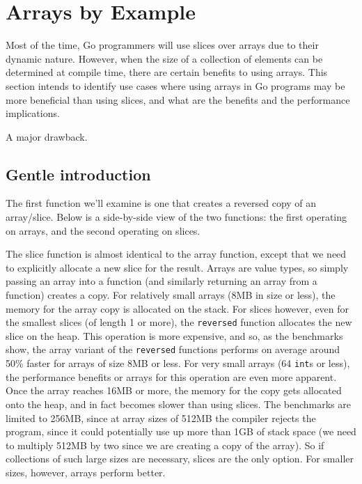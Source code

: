 \section{Arrays by Example}

Most of the time, Go programmers will use slices over arrays due to their
dynamic nature. However, when the size of a collection of elements can be
determined at compile time, there are certain benefits to using arrays. This
section intends to identify use cases where using arrays in Go programs may be
more beneficial than using slices, and what are the benefits and the performance
implications.

A major drawback.

\subsection{Gentle introduction}

The first function we'll examine is one that creates a reversed copy of an
array/slice. Below is a side-by-side view of the two functions: the first
operating on arrays, and the second operating on slices.






The slice function is almost identical to the array function, except that we
need to explicitly allocate a new slice for the result. Arrays are value types,
so simply passing an array into a function (and similarly returning an array
from a function) creates a copy. For relatively small arrays (8MB in size or
less), the memory for the array copy is allocated on the stack. For slices
however, even for the smallest slices (of length 1 or more), the
\texttt{reversed} function allocates the new slice on the heap. This operation
is more expensive, and so, as the benchmarks show, the array variant of the
\texttt{reversed} functions performs on average around 50\% faster for arrays of
size 8MB or less. For very small arrays (64 \texttt{int}s or less), the
performance benefits or arrays for this operation are even more apparent. Once
the array reaches 16MB or more, the memory for the copy gets allocated onto the
heap, and in fact becomes slower than using slices. The benchmarks are limited
to 256MB, since at array sizes of 512MB the compiler rejects the program, since
it could potentially use up more than 1GB of stack space (we need to multiply
512MB by two since we are creating a copy of the array). So if collections of
such large sizes are necessary, slices are the only option. For smaller sizes,
however, arrays perform better.

